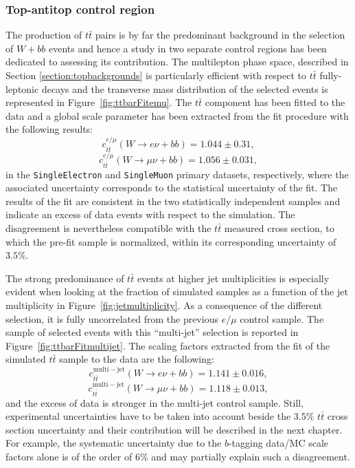 
\subsubsection{Top-antitop control region}
\label{sec:ttbar}

The production of $t\bar{t}$ pairs is by far the predominant background
in the selection of $W + bb$ events and hence a study in two separate
control regions has been dedicated to assessing its contribution.
The multilepton phase space, described in Section \ref{section:topbackgrounds}
is particularly efficient with respect to $t\bar{t}$
fully-leptonic decays and the transverse mass distribution
of the selected events is represented in Figure~\ref{fig:ttbarFitemu}.
The $t\bar{t}$ component has been fitted to the data and a global scale
parameter has been extracted from the fit procedure with the following results:
$$c_{t\bar{t}}^{e/\mu}(W \rightarrow e \nu + bb) = 1.044 \pm 0.31 \mathrm{,}$$
$$c_{t\bar{t}}^{e/\mu}(W \rightarrow \mu \nu + bb) = 1.056 \pm 0.031 \mathrm{,}$$
in the \texttt{SingleElectron} and \texttt{SingleMuon} primary datasets,
respectively, where the associated uncertainty corresponds to
the statistical uncertainty of the fit.
The results of the fit are consistent in the two statistically independent
samples and indicate an excess of data events with respect to the simulation.
The disagreement is nevertheless compatible with the
$t\bar{t}$ measured cross section,
to which the pre-fit sample is normalized, within its corresponding uncertainty
of $3.5\%$.

The strong predominance of $t\bar{t}$ events at higher
jet multiplicities is especially evident when looking at the fraction of simulated
samples as a function of the jet multiplicity in Figure~\ref{fig:jetmultiplicity}.
As a consequence of the different selection,
it is fully uncorrelated from the previous $e/\mu$ control sample.
The sample of selected events with this ``multi-jet''
selection is reported in Figure~\ref{fig:ttbarFitmultijet}.
The scaling factors extracted from the fit of the simulated $t\bar{t}$ sample
to the data are the following:
$$c_{t\bar{t}}^{\mathrm{multi-jet}}(W \rightarrow e \nu + bb) = 1.141 \pm 0.016 \mathrm{,}$$
$$c_{t\bar{t}}^{\mathrm{multi-jet}}(W \rightarrow \mu \nu + bb) =1.118 \pm 0.013 \mathrm{,}$$
and the excess of data is stronger in the multi-jet control sample.
Still, experimental uncertainties have to be taken into account beside the
$3.5\%$ $t\bar{t}$ cross section uncertainty and their contribution
will be described in the next chapter.
For example, the systematic uncertainty due to the $b$-tagging data/MC scale factors alone
is of the order of $6\%$ and may partially explain such a disagreement.


